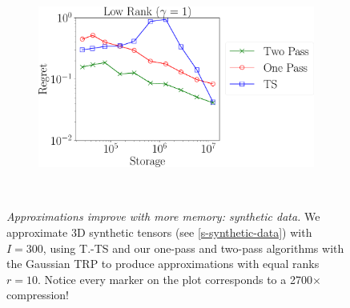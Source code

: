 \begin{figure}
\begin{subfigure}{0.43\textwidth}
		\includegraphics[scale = 0.24]{figure/fig1_lk_hnoise.pdf}
	\end{subfigure}\\
	\caption{\textit{Approximations improve with more memory: synthetic data.}
	We approximate 3D synthetic tensors (see \ref{s-synthetic-data}) with $I = 300$,
	using  T.-TS and our one-pass and two-pass algorithms
	with the Gaussian TRP to produce approximations with equal ranks $r=10$.
	Notice every marker on the plot corresponds to a 2700$\times$ compression!}\label{fig:vary-memory}
\end{figure}

